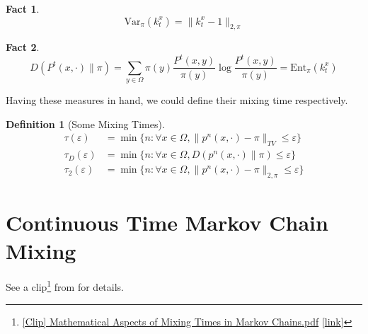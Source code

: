 \documentclass{article}
\newtheorem{define}{Definition}[section]
\newtheorem{fact}{Fact}[section]
\begin{document}
\begin{fact}
  \[\mathrm{Var}_\pi(k^x_t) = \parallel k^x_t - 1 \parallel_{2, \pi}\]
\end{fact}

\begin{fact}
  \[D(P^t(x, \cdot) \parallel \pi) =\sum_{y\in \Omega}\pi(y)\frac{P^t(x, y)}{\pi(y)}\log \frac{P^t(x,y)}{\pi(y)} = \mathrm{Ent}_\pi (k^x_t)\]
\end{fact}

Having these measures in hand, we could define their mixing time respectively.

\begin{define}[Some Mixing Times]
  \begin{align*}
    \tau(\varepsilon) &= \min\{n: \forall x\in \Omega, \parallel p^n(x,\cdot) - \pi \parallel_{TV} \leq \varepsilon\} \\
    \tau_D(\varepsilon) &= \min\{n: \forall x\in \Omega, D(p^n(x,\cdot) \parallel \pi) \leq \varepsilon\} \\
    \tau_2(\varepsilon) &= \min\{n: \forall x\in \Omega, \parallel p^n(x,\cdot) - \pi \parallel_{2, \pi} \leq \varepsilon\} 
  \end{align*}
\end{define}

\section{Continuous Time Markov Chain Mixing}
See a clip\footnote{\href{file://./[Clip] Mathematical Aspects of Mixing Times in Markov Chains.pdf}{[Clip] Mathematical Aspects of Mixing Times in Markov Chains.pdf} [\href{https://chenxiaoyu233.github.io/Archive-of-Notes/Small\%20Topics/CTMC-mixing-time/[Clip] Mathematical Aspects of Mixing Times in Markov Chains.pdf}{link}]} from \cite{montenegro2006mathematical} for details.

\clearpage


\end{document}
